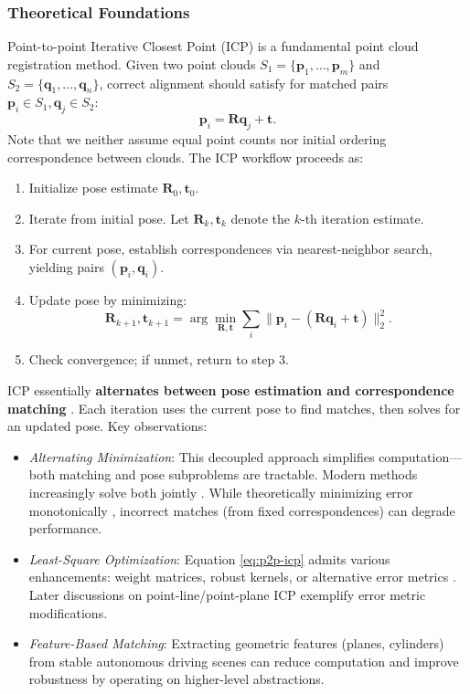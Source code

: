 \subsubsection{Theoretical Foundations}  
Point-to-point Iterative Closest Point (ICP) is a fundamental point cloud registration method. Given two point clouds $S_1=\{\bm{p}_1, \ldots, \bm{p}_m\}$ and $S_2 = \{\bm{q}_1, \ldots, \bm{q}_n\}$, correct alignment should satisfy for matched pairs $\bm{p}_i \in S_1, \bm{q}_j \in S_2$:  
\begin{equation}\label{key}  
	\bm{p}_i = \bm{R} \bm{q}_j + \bm{t}.  
\end{equation}  
Note that we neither assume equal point counts nor initial ordering correspondence between clouds. The ICP workflow proceeds as:  
\begin{enumerate}  
	\item Initialize pose estimate $\bm{R}_0, \bm{t}_0$.  
	\item Iterate from initial pose. Let $\bm{R}_k, \bm{t}_k$ denote the $k$-th iteration estimate.  
	\item For current pose, establish correspondences via nearest-neighbor search, yielding pairs $(\bm{p}_i, \bm{q}_i)$.  
	\item Update pose by minimizing:  
	\begin{equation}\label{eq:p2p-icp}  
		\bm{R}_{k+1}, \bm{t}_{k+1} = \arg \min\limits_{\bm{R}, \bm{t}} \sum_{i} \| \bm{p}_i - (\bm{R} \bm{q}_i + \bm{t}) \|_2^2.  
	\end{equation}  
	\item Check convergence; if unmet, return to step 3.  
\end{enumerate}  

ICP essentially \textbf{alternates between pose estimation and correspondence matching} \cite{Pavlov2018}. Each iteration uses the current pose to find matches, then solves for an updated pose. Key observations:  

\begin{itemize}  
	\item \textit{Alternating Minimization}: This decoupled approach simplifies computation—both matching and pose subproblems are tractable. Modern methods increasingly solve both jointly \cite{Yang2020}. While theoretically minimizing error monotonically \cite{Zhang2021a}, incorrect matches (from fixed correspondences) can degrade performance.  
	\item \textit{Least-Square Optimization}: Equation \eqref{eq:p2p-icp} admits various enhancements: weight matrices, robust kernels, or alternative error metrics \cite{Pottmann2004,Zinser2003,segal2009generalized}. Later discussions on point-line/point-plane ICP \cite{Chen1992} exemplify error metric modifications.  
	\item \textit{Feature-Based Matching}: Extracting geometric features (planes, cylinders) from stable autonomous driving scenes can reduce computation and improve robustness by operating on higher-level abstractions.  
\end{itemize}  

